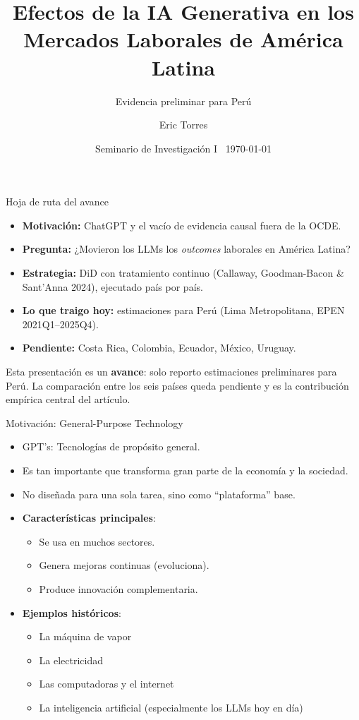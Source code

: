\documentclass[aspectratio=169,11pt]{beamer}
\title{Efectos de la IA Generativa en los Mercados Laborales de América Latina}
\subtitle{Evidencia preliminar para Perú}
\author{Eric Torres}
\institute{Pontificia Universidad Católica del Perú (PUCP) \textbar\ Programa Doctoral en Economía}
\date{Seminario de Investigación I \textbar\ \today}
\newcommand{\callout}[2][pblue]{%
  \begin{center}
  \begin{minipage}{0.95\linewidth}
    \setlength{\fboxsep}{0.7em}%
    \colorbox{#1!8}{%
      \begin{minipage}{\dimexpr\linewidth-1.4em}%
        \color{pdark}#2%
      \end{minipage}%
    }%
  \end{minipage}
  \end{center}
}
\newcommand{\cit}[1]{\textcolor{pgray}{\small(#1)}}
\begin{document}
{
\begin{frame}[plain]
  \titlepage
\end{frame}
}
\addtocounter{framenumber}{-1}

\begin{frame}{Hoja de ruta del avance}
\vspace{0.4em}
\begin{itemize}
  \item \textbf{Motivación:} ChatGPT y el vacío de evidencia causal fuera de la OCDE.
  \item \textbf{Pregunta:} ¿Movieron los LLMs los \textit{outcomes} laborales en América Latina?
  \item \textbf{Estrategia:} DiD con tratamiento continuo \cit{Callaway, Goodman-Bacon \& Sant'Anna 2024}, ejecutado país por país.
  \item \textbf{Lo que traigo hoy:} estimaciones para Perú (Lima Metropolitana, EPEN 2021Q1--2025Q4).
  \item \textbf{Pendiente:} Costa Rica, Colombia, Ecuador, México, Uruguay.
\end{itemize}

\vspace{0.6em}
\callout{Esta presentación es un \textbf{avance}: solo reporto estimaciones preliminares para Perú. La comparación entre los seis países queda pendiente y es la contribución empírica central del artículo.}
\end{frame}

\begin{frame}{Motivación: General-Purpose Technology}
\vspace{0.3em}
\begin{itemize}
  \item GPT's: Tecnologías de propósito general.
  \item Es tan importante que transforma gran parte de la economía y la sociedad.
  \item No diseñada para una sola tarea, sino como “plataforma” base.
  \item \textbf{Características principales}:
    \begin{itemize}
      \item Se usa en muchos sectores. 
     \item Genera mejoras continuas (evoluciona).
     \item Produce innovación complementaria. 
     \end{itemize}
  \item \textbf{Ejemplos históricos}:
     \begin{itemize}
     \item La máquina de vapor
     \item La electricidad
     \item Las computadoras y el internet
     \item La inteligencia artificial (especialmente los LLMs hoy en día)
     \end{itemize}

       
  

\end{itemize}
\end{frame}
\end{document}
